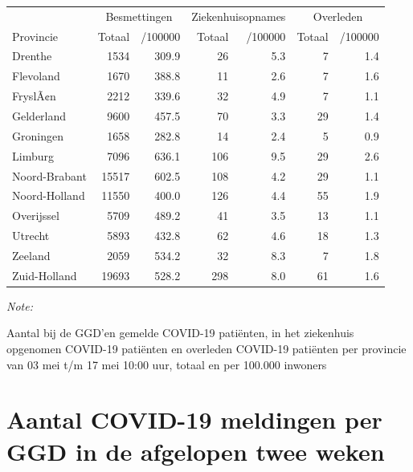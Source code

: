 \documentclass[
  english,
  man,floatsintext]{apa6}
\begin{document}
\begin{table}
\centering
\begin{threeparttable}
\begin{tabular}{lrrrrrr}
\toprule
\multicolumn{1}{c}{ } & \multicolumn{2}{c}{Besmettingen} & \multicolumn{2}{c}{Ziekenhuisopnames} & \multicolumn{2}{c}{Overleden} \\
\cmidrule(l{3pt}r{3pt}){2-3} \cmidrule(l{3pt}r{3pt}){4-5} \cmidrule(l{3pt}r{3pt}){6-7}
Provincie & Totaal & /100000 & Totaal & /100000 & Totaal & /100000\\
\midrule
Drenthe & 1534 & 309.9 & 26 & 5.3 & 7 & 1.4\\
Flevoland & 1670 & 388.8 & 11 & 2.6 & 7 & 1.6\\
FryslÃ¢n & 2212 & 339.6 & 32 & 4.9 & 7 & 1.1\\
Gelderland & 9600 & 457.5 & 70 & 3.3 & 29 & 1.4\\
Groningen & 1658 & 282.8 & 14 & 2.4 & 5 & 0.9\\
Limburg & 7096 & 636.1 & 106 & 9.5 & 29 & 2.6\\
Noord-Brabant & 15517 & 602.5 & 108 & 4.2 & 29 & 1.1\\
Noord-Holland & 11550 & 400.0 & 126 & 4.4 & 55 & 1.9\\
Overijssel & 5709 & 489.2 & 41 & 3.5 & 13 & 1.1\\
Utrecht & 5893 & 432.8 & 62 & 4.6 & 18 & 1.3\\
Zeeland & 2059 & 534.2 & 32 & 8.3 & 7 & 1.8\\
Zuid-Holland & 19693 & 528.2 & 298 & 8.0 & 61 & 1.6\\
\bottomrule
\end{tabular}
\begin{tablenotes}
\item \textit{Note: } 
\item Aantal bij de GGD’en gemelde COVID-19 patiënten, in het ziekenhuis opgenomen COVID-19 patiënten en overleden COVID-19 patiënten per provincie van 03 mei t/m 17 mei 10:00 uur, totaal en per 100.000 inwoners
\end{tablenotes}
\end{threeparttable}
\end{table}

\newpage

\hypertarget{aantal-covid-19-meldingen-per-ggd-in-de-afgelopen-twee-weken}{%
\section{Aantal COVID-19 meldingen per GGD in de afgelopen twee weken}\label{aantal-covid-19-meldingen-per-ggd-in-de-afgelopen-twee-weken}}
\end{document}
